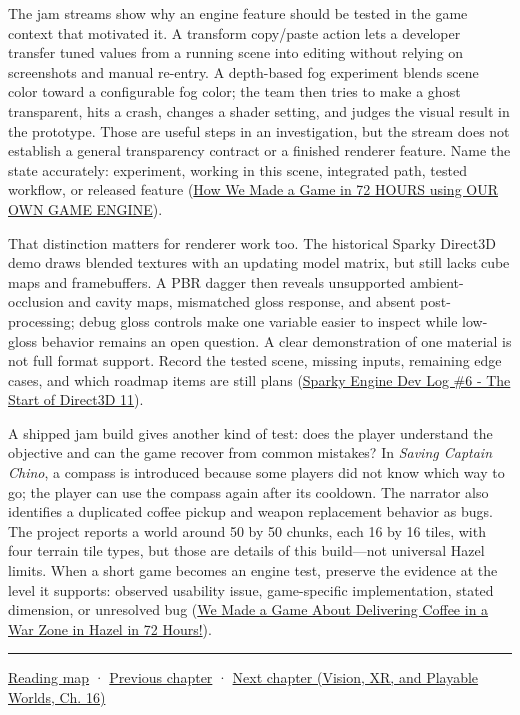 The jam streams show why an engine feature should be tested in the game context that motivated it. A transform copy/paste action lets a developer transfer tuned values from a running scene into editing without relying on screenshots and manual re-entry. A depth-based fog experiment blends scene color toward a configurable fog color; the team then tries to make a ghost transparent, hits a crash, changes a shader setting, and judges the visual result in the prototype. Those are useful steps in an investigation, but the stream does not establish a general transparency contract or a finished renderer feature. Name the state accurately: experiment, working in this scene, integrated path, tested workflow, or released feature (\href{https://www.youtube.com/watch?v=tQ_pjZDfm-0&t=1m10s}{How We Made a Game in 72 HOURS using OUR OWN GAME ENGINE}).

That distinction matters for renderer work too. The historical Sparky Direct3D demo draws blended textures with an updating model matrix, but still lacks cube maps and framebuffers. A PBR dagger then reveals unsupported ambient-occlusion and cavity maps, mismatched gloss response, and absent post-processing; debug gloss controls make one variable easier to inspect while low-gloss behavior remains an open question. A clear demonstration of one material is not full format support. Record the tested scene, missing inputs, remaining edge cases, and which roadmap items are still plans (\href{https://www.youtube.com/watch?v=AsNE-eGmGxs&t=7m34s}{Sparky Engine Dev Log \#6 - The Start of Direct3D 11}).

A shipped jam build gives another kind of test: does the player understand the objective and can the game recover from common mistakes? In \emph{Saving Captain Chino}, a compass is introduced because some players did not know which way to go; the player can use the compass again after its cooldown. The narrator also identifies a duplicated coffee pickup and weapon replacement behavior as bugs. The project reports a world around 50 by 50 chunks, each 16 by 16 tiles, with four terrain tile types, but those are details of this build---not universal Hazel limits. When a short game becomes an engine test, preserve the evidence at the level it supports: observed usability issue, game-specific implementation, stated dimension, or unresolved bug (\href{https://www.youtube.com/watch?v=ahrdtYwBLTk&t=2m10s}{We Made a Game About Delivering Coffee in a War Zone in Hazel in 72 Hours!}).

\begin{center}\rule{0.5\linewidth}{0.5pt}\end{center}

\hyperref[volume-reading-map]{Reading map} · \hyperref[06-engine-ii-ch039-composable-timesteps-and-stable-simulation-policy]{Previous chapter} · \href{../07-Vision-XR-and-Playable-Worlds/main.pdf\#nameddest=06-engine-ii-ch041-evidence-tools-and-revisable-design}{Next chapter (Vision, XR, and Playable Worlds, Ch. 16)}
